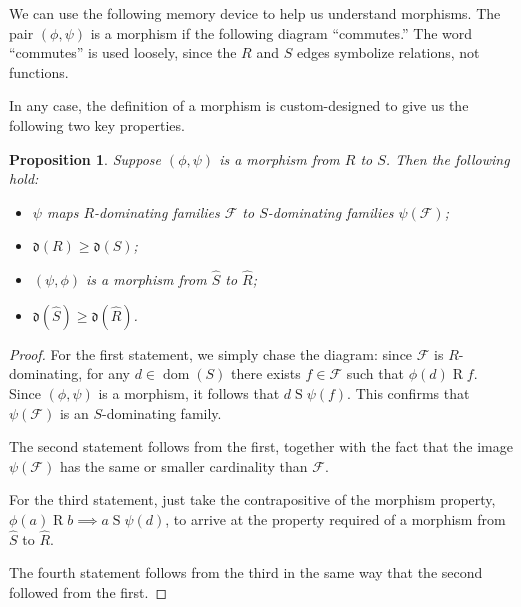 \documentclass[11pt,oneside,a4paper]{amsbook}
\DeclareMathOperator{\dom}{dom}
\DeclareMathOperator{\cod}{cod}
\theoremstyle{definition}
\theoremstyle{plain}
\newtheorem{proposition}[theorem]{Proposition}
\theoremstyle{definition}
\theoremstyle{remark}
\numberwithin{equation}{section}
\numberwithin{figure}{section}
\begin{document}
We can use the following memory device to help us understand morphisms. The pair $(\phi,\psi)$ is a morphism if the following diagram ``commutes.'' The word ``commutes'' is used loosely, since the $R$ and $S$ edges symbolize relations, not functions.
\begin{center}
\end{center}
In any case, the definition of a morphism is custom-designed to give us the following two key properties.

\begin{proposition}
  \label{prop:morphism}
  Suppose $(\phi,\psi)$ is a morphism from $R$ to $S$. Then the following hold:
  \begin{itemize}
    \item $\psi$ maps $R$-dominating families $\mathcal F$ to $S$-dominating families $\psi(\mathcal F)$;
    \item $\mathfrak d(R)\geq\mathfrak d(S)$;
    \item $(\psi,\phi)$ is a morphism from $\hat S$ to $\hat R$;
    \item $\mathfrak d(\hat S)\geq\mathfrak d(\hat R)$.
  \end{itemize}
\end{proposition}

\begin{proof}
  For the first statement, we simply chase the diagram: since $\mathcal F$ is $R$-dominating, for any $d\in\dom(S)$ there exists $f\in\mathcal F$ such that $\phi(d)\mathrel{R}f$. Since $(\phi,\psi)$ is a morphism, it follows that $d\mathrel{S}\psi(f)$. This confirms that $\psi(\mathcal F)$ is an $S$-dominating family.

  The second statement follows from the first, together with the fact that the image $\psi(\mathcal F)$ has the same or smaller cardinality than $\mathcal F$.

  For the third statement, just take the contrapositive of the morphism property, $\phi(a)\mathrel R b\implies a\mathrel S\psi(d)$, to arrive at the property required of a morphism from $\hat S$ to $\hat R$.

  The fourth statement follows from the third in the same way that the second followed from the first.
\end{proof}
\end{document}
